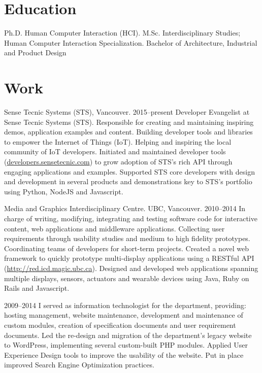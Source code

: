 \documentclass[full]{rvca}
\begin{document}
\section{Education}
Ph.D. Human Computer Interaction (HCI).
M.Sc. Interdisciplinary Studies;\\Human Computer Interaction Specialization.
Bachelor of Architecture, Industrial and Product Design

\section{Work}


\workitem
{Sense Tecnic Systems (STS), Vancouver.}%
{2015--present}%
{Developer Evangelist at Sense Tecnic Systems (STS). Responsible for creating and maintaining inspiring demos, application examples and content. Building developer tools and libraries to empower the Internet of Things (IoT). Helping and inspiring the local community of IoT developers.}%
{Initiated and maintained developer tools (\href{http://developers.sensetecnic.com}{developers.sensetecnic.com}) to grow adoption of STS's rich API through engaging applications and examples.}%
{Supported STS core developers with design and development in several products and demonstrations key to STS's portfolio using Python, NodeJS and Javascript.}

\workitem
{Media and Graphics Interdisciplinary Centre. UBC, Vancouver.}%
{2010--2014}%
{In charge of writing, modifying, integrating and testing software code for interactive content, web applications and middleware applications. Collecting user requirements through usability studies and medium to high fidelity prototypes. Coordinating teams of developers for short-term projects.}%
{Created a novel web framework to quickly prototype multi-display applications using a RESTful API (\href{http://red.icd.magic.ubc.ca}{http://red.icd.magic.ubc.ca}).}%
{Designed and developed web applications spanning multiple displays, sensors, actuators and wearable devices using Java, Ruby on Rails and Javascript.}

{2009--2014}
{I served as information technologist for the department, providing: hosting management, website maintenance, development and maintenance of custom modules, creation of specification documents and user requirement documents.}
{Led the re-design and migration of the department's legacy website to WordPress, implementing several custom-built PHP modules.}
{Applied User Experience Design tools to improve the usability of the website. Put in place improved Search Engine Optimization practices.}
\end{document}
